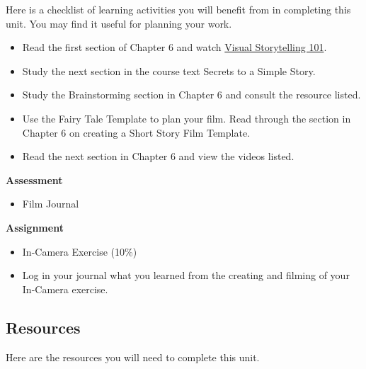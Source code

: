 \documentclass[
]{book}
\providecommand{\tightlist}{%
  \setlength{\itemsep}{0pt}\setlength{\parskip}{0pt}}
\begin{document}
\begin{reflect}
Here is a checklist of learning activities you will benefit from in completing this unit. You may find it useful for planning your work.

\begin{itemize}
\tightlist
\item
  Read the first section of Chapter 6 and watch \href{https://www.youtube.com/watch?v=iWQQgZh9EyE}{Visual Storytelling 101}.\\
\item
  Study the next section in the course text Secrets to a Simple Story.\\
\item
  Study the Brainstorming section in Chapter 6 and consult the resource listed.\\
\item
  Use the Fairy Tale Template to plan your film. Read through the section in Chapter 6 on creating a Short Story Film Template.\\
\item
  Read the next section in Chapter 6 and view the videos listed.
\end{itemize}

\textbf{Assessment}

\begin{itemize}
\tightlist
\item
  Film Journal
\end{itemize}

\textbf{Assignment}

\begin{itemize}
\item
  In-Camera Exercise (10\%)
\item
  Log in your journal what you learned from the creating and filming of your In-Camera exercise.
\end{itemize}
\end{reflect}

\hypertarget{resources-5}{%
\subsection*{Resources}\label{resources-5}}

Here are the resources you will need to complete this unit.
\end{document}
